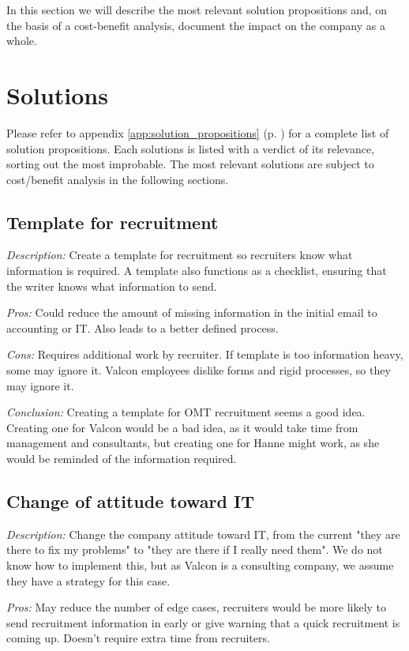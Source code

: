 In this section we will describe the most relevant solution propositions and, on the basis of a cost-benefit analysis, document the impact on the company as a whole.

\section{Solutions}
Please refer to appendix \ref{app:solution_propositions} (p. \pageref{app:solution_propositions}) for a complete list of solution propositions. Each solutions is listed with a verdict of its relevance, sorting out the most improbable.
The most relevant solutions are subject to cost/benefit analysis in the following sections.

\subsection{Template for recruitment}
\emph{Description:} Create a template for recruitment so recruiters know what information is required. A template also functions as a checklist, ensuring that the writer knows what information to send.

\emph{Pros:} Could reduce the amount of missing information in the initial email to accounting or IT. 
Also leads to a better defined process.

\emph{Cons:} Requires additional work by recruiter. 
If template is too information heavy, some may ignore it.
Valcon employees dislike forms and rigid processes, so they may ignore it.

\emph{Conclusion:} Creating a template for OMT recruitment seems a good idea.
Creating one for Valcon would be a bad idea, as it would take time from management and consultants, but creating one for Hanne might work, as she would be reminded of the information required.

\subsection{Change of attitude toward IT}
\emph{Description:} Change the company attitude toward IT, from the current "they are there to fix my problems" to "they are there if I really need them".
We do not know how to implement this, but as Valcon is a consulting company, we assume they have a strategy for this case.

\emph{Pros:} May reduce the number of edge cases, recruiters would be more likely to send recruitment information in early or give warning that a quick recruitment is coming up.
Doesn't require extra time from recruiters.

